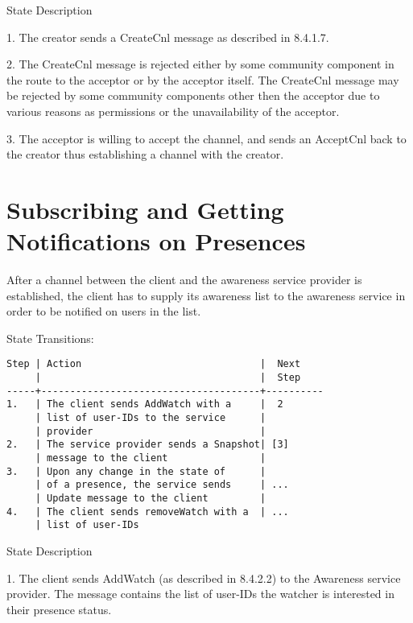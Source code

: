 \documentclass[titlepage,oneside]{book}
\begin{document}
\par{} State Description

\par{} 1. The creator sends a CreateCnl message as described in
8.4.1.7.

\par{} 2. The CreateCnl message is rejected either by some community
component in the route to the acceptor or by the acceptor itself. The
CreateCnl message may be rejected by some community components other
then the acceptor due to various reasons as permissions or the
unavailability of the acceptor.

\par{} 3. The acceptor is willing to accept the channel, and sends an
AcceptCnl back to the creator thus establishing a channel with the
creator.

\section{Subscribing and Getting Notifications on Presences}

\par{} After a channel between the client and the awareness service
provider is established, the client has to supply its awareness list
to the awareness service in order to be notified on users in the list.

\par{} State Transitions:

\begin{verbatim}
Step | Action                               |  Next
     |                                      |  Step
-----+--------------------------------------+----------
1.   | The client sends AddWatch with a     |  2
     | list of user-IDs to the service      |
     | provider                             |
2.   | The service provider sends a Snapshot| [3]
     | message to the client                |
3.   | Upon any change in the state of      |
     | of a presence, the service sends     | ...
     | Update message to the client         |
4.   | The client sends removeWatch with a  | ...
     | list of user-IDs
\end{verbatim}

\par{} State Description

\par{} 1. The client sends AddWatch (as described in 8.4.2.2) to the
Awareness service provider. The message contains the list of user-IDs
the watcher is interested in their presence status.
\end{document}

